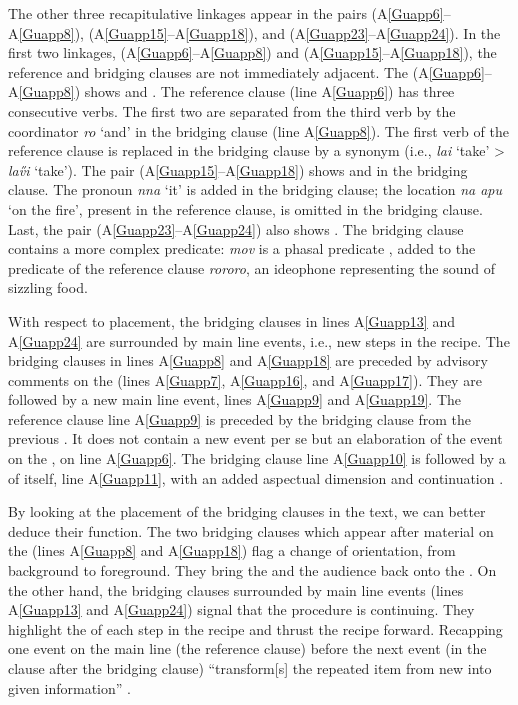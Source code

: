 \documentclass[output=paper]{LSP/langsci}
\begin{document}
The other three recapitulative linkages appear in the pairs (A\ref{Guapp6}--A\ref{Guapp8}), (A\ref{Guapp15}--A\ref{Guapp18}), and (A\ref{Guapp23}--A\ref{Guapp24}). In the first two linkages, (A\ref{Guapp6}--A\ref{Guapp8}) and (A\ref{Guapp15}--A\ref{Guapp18}), the reference and bridging clauses are not immediately adjacent. The  (A\ref{Guapp6}--A\ref{Guapp8}) shows  and . The reference clause (line A\ref{Guapp6}) has three consecutive verbs. The first two are separated from the third verb by the coordinator \textit{ro} `and' in the bridging clause (line A\ref{Guapp8}). The first verb of the reference clause is replaced in the bridging clause by a synonym (i.e., \textit{lai} `take' > \textit{la\H{v}i} `take'). The pair (A\ref{Guapp15}--A\ref{Guapp18}) shows  and  in the bridging clause. The pronoun \textit{nna} `it' is added in the bridging clause; the location \textit{na apu} `on the fire', present in the reference clause, is omitted in the bridging clause. Last, the pair (A\ref{Guapp23}--A\ref{Guapp24}) also shows . The bridging clause contains a more complex predicate: \textit{mov} is a phasal predicate \citep[][342]{guerin11}, added to the predicate of the reference clause \textit{rororo}, an ideophone representing the sound of sizzling food. 

With respect to placement, the bridging clauses in lines A\ref{Guapp13} and A\ref{Guapp24} are surrounded by main line events, i.e., new steps in the recipe. The bridging clauses in lines A\ref{Guapp8} and A\ref{Guapp18} are preceded by advisory comments on the  (lines A\ref{Guapp7}, A\ref{Guapp16}, and A\ref{Guapp17}). They are followed by a new main line event, lines A\ref{Guapp9} and A\ref{Guapp19}. The reference clause line A\ref{Guapp9} is preceded by the bridging clause from the previous . It does not contain a new event per se but an elaboration of the event on the , on line A\ref{Guapp6}. The bridging clause line A\ref{Guapp10} is followed by a  of itself, line A\ref{Guapp11}, with an added aspectual dimension and continuation . 

By looking at the placement of the bridging clauses in the text, we can better deduce their function. The two bridging clauses which appear after material on the  (lines A\ref{Guapp8} and A\ref{Guapp18}) flag a change of orientation, from background to foreground. They bring the  and the audience back onto the . On the other hand, the bridging clauses surrounded by main line events (lines A\ref{Guapp13} and A\ref{Guapp24}) signal that the procedure is continuing. They highlight the  of each step in the recipe and thrust the recipe forward. Recapping one event on the main line (the reference clause) before the next event (in the clause after the bridging clause) ``transform[s] the repeated item from new into given information'' \citep[][224]{brown.2000}.   
\end{document}
